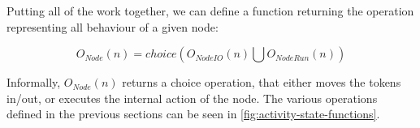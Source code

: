 \begin{definition}
	Putting all of the work together, we can define a function returning the operation representing all behaviour of a given node:
	
	\begin{equation*}
		O_\mathit{Node}(n) = \mathit{choice}\left(O_\mathit{NodeIO}(n) \bigcup O_\mathit{NodeRun}(n)\right)
	\end{equation*}
\end{definition}

Informally, \(O_\mathit{Node}(n)\) returns a choice operation, that either moves the tokens in/out, or executes the internal action of the node. The various operations defined in the previous sections can be seen in \autoref{fig:activity-state-functions}. 

\iffalse

